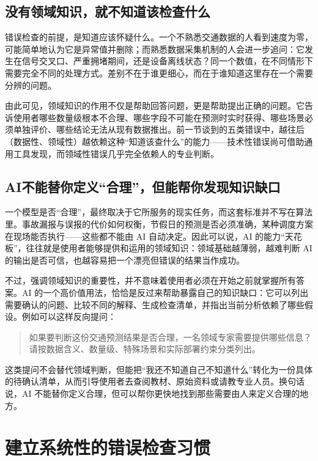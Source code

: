 \subsection{没有领域知识，就不知道该检查什么}

错误检查的前提，是知道应该怀疑什么。一个不熟悉交通数据的人看到速度为零，可能简单地认为它是异常值并删除；而熟悉数据采集机制的人会进一步追问：它发生在信号交叉口、严重拥堵期间，还是设备离线状态？同一个数值，在不同情形下需要完全不同的处理方式。差别不在于谁更细心，而在于谁知道这里存在一个需要分辨的问题。

由此可见，领域知识的作用不仅是帮助回答问题，更是帮助提出正确的问题。它告诉使用者哪些数量级根本不合理、哪些字段不可能在预测时实时获得、哪些场景必须单独评价、哪些结论无法从现有数据推出。前一节谈到的五类错误中，越往后（数据性、领域性）越依赖这种“知道该查什么”的能力——技术性错误尚可借助通用工具发现，而领域性错误几乎完全依赖人的专业判断。

\subsection{AI不能替你定义“合理”，但能帮你发现知识缺口}

一个模型是否“合理”，最终取决于它所服务的现实任务，而这套标准并不写在算法里。事故漏报与误报的代价如何权衡，节假日的预测是否必须准确，某种调度方案在现场能否执行——这些都不能由 AI 自动决定。因此可以说，AI 的能力“天花板”，往往就是使用者能够提供和运用的领域知识：领域基础越薄弱，越难判断 AI 的输出是否可信，也越容易把一个漂亮但错误的结果当作成功。

不过，强调领域知识的重要性，并不意味着使用者必须在开始之前就掌握所有答案。AI 的一个高价值用法，恰恰是反过来帮助暴露自己的知识缺口：它可以列出需要确认的问题、比较不同的解释、生成检查清单，并指出当前分析依赖了哪些假设。例如可以这样反向提问：

\begin{quote}
如果要判断这份交通预测结果是否合理，一名领域专家需要提供哪些信息？请按数据含义、数量级、特殊场景和实际部署约束分类列出。
\end{quote}

这类提问不会替代领域判断，但能把“我还不知道自己不知道什么”转化为一份具体的待确认清单，从而引导使用者去查阅教材、原始资料或请教专业人员。换句话说，AI 不能替你定义合理，但可以帮你更快地找到那些需要由人来定义合理的地方。

\section{建立系统性的错误检查习惯}


